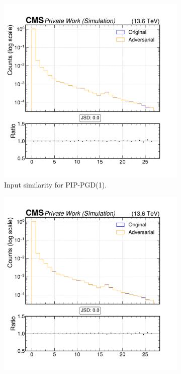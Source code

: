 \begin{figure}[h]
  \centering
  \begin{subfigure}[t]{0.32\textwidth}
    \includegraphics[width=\linewidth]{media/output/features/compare/combined_it_1/cmp_vtx_arr_sv_d3d.pdf}
    \caption*{Input similarity for PIP-PGD(1).}
  \end{subfigure}\hfill
  \begin{subfigure}[t]{0.32\textwidth}
    \includegraphics[width=\linewidth]{media/output/features/compare/combined_it_2/cmp_vtx_arr_sv_d3d.pdf}

\end{subfigure}
\end{figure}
